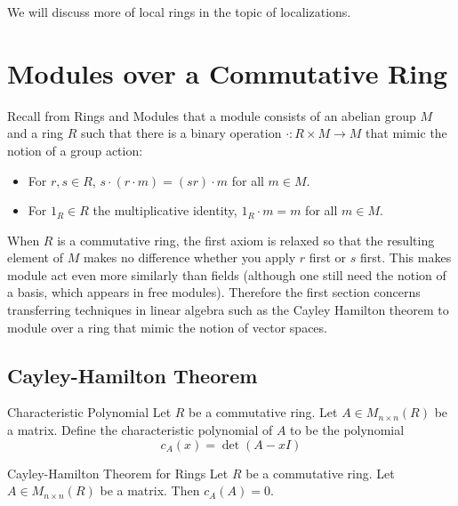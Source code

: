 \documentclass[a4paper]{article}
\begin{document}
We will discuss more of local rings in the topic of localizations. 

\pagebreak
\section{Modules over a Commutative Ring}
Recall from Rings and Modules that a module consists of an abelian group $M$ and a ring $R$ such that there is a binary operation $\cdot:R\times M\to M$ that mimic the notion of a group action: 
\begin{itemize}
\item For $r,s\in R$, $s\cdot(r\cdot m)=(sr)\cdot m$ for all $m\in M$. 
\item For $1_R\in R$ the multiplicative identity, $1_R\cdot m=m$ for all $m\in M$. 
\end{itemize}

When $R$ is a commutative ring, the first axiom is relaxed so that the resulting element of $M$ makes no difference whether you apply $r$ first or $s$ first. This makes module act even more similarly than fields (although one still need the notion of a basis, which appears in free modules). Therefore the first section concerns transferring techniques in linear algebra such as the Cayley Hamilton theorem to module over a ring that mimic the notion of vector spaces. 

\subsection{Cayley-Hamilton Theorem}
\begin{defn}{Characteristic Polynomial}{} Let $R$ be a commutative ring. Let $A\in M_{n\times n}(R)$ be a matrix. Define the characteristic polynomial of $A$ to be the polynomial $$c_A(x)=\det(A-xI)$$
\end{defn}

\begin{thm}{Cayley-Hamilton Theorem for Rings}{} Let $R$ be a commutative ring. Let $A\in M_{n\times n}(R)$ be a matrix. Then $c_A(A)=0$. 
\end{thm}
\end{document}
